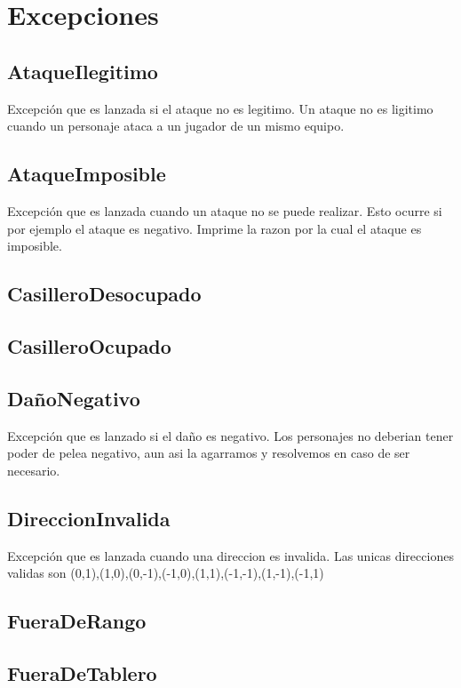 \documentclass[a4paper]{article}
\begin{document}
\newpage
\section{Excepciones}


\subsection{AtaqueIlegitimo}
 Excepción que es lanzada si el ataque no es legitimo. Un ataque no es ligitimo cuando un personaje ataca a un jugador de un mismo equipo.

\subsection{AtaqueImposible}
 Excepción que es lanzada cuando un ataque no se puede realizar. Esto ocurre si por ejemplo el ataque es negativo. Imprime la razon por la cual el ataque es imposible.

\subsection{CasilleroDesocupado}

\subsection{CasilleroOcupado}

\subsection{DañoNegativo}
Excepción que es lanzado si el daño es negativo. Los personajes no deberian tener poder de pelea negativo, aun asi la agarramos y resolvemos en caso de ser necesario.

\subsection{DireccionInvalida}
Excepción que es lanzada cuando una direccion es invalida. Las unicas direcciones validas son (0,1),(1,0),(0,-1),(-1,0),(1,1),(-1,-1),(1,-1),(-1,1)

\subsection{FueraDeRango} 

\subsection{FueraDeTablero} 
\end{document}
